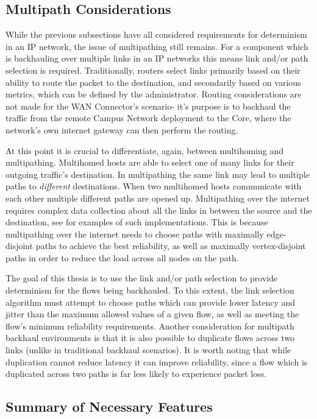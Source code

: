 \subsection{Multipath Considerations}

While the previous subsections have all considered requirements for determinism in an IP network, the issue of multipathing still remains. For a component which is backhauling over multiple links in an IP networks this means link and/or path selection is required. Traditionally, routers select links primarily based on their ability to route the packet to the destination, and secondarily based on various metrics, which can be defined by the administrator. Routing considerations are not made for the WAN Connector's scenario- it's purpose is to backhaul the traffic from the remote Campus Network deployment to the Core, where the network's own internet gateway can then perform the routing.

At this point it is crucial to differentiate, again, between multihoming and multipathing. Multihomed hosts are able to select one of many links for their outgoing traffic's destination. In multipathing the same link may lead to multiple paths to \textit{different} destinations. When two multihomed hosts communicate with each other multiple different paths are opened up. Multipathing over the internet requires complex data collection about all the links in between the source and the destination, see \cite{ganichev2010yamr, apostolaki2021performance,} for examples of such implementations. This is because multipathing over the internet needs to choose paths with maximally edge-disjoint paths to achieve the best reliability, as well as maximally vertex-disjoint paths in order to reduce the load across all nodes on the path.

The goal of this thesis is to use the link and/or path selection to provide determinism for the flows being backhauled. To this extent, the link selection algorithm must attempt to choose paths which can provide lower latency and jitter than the maximum allowed values of a given flow, as well as meeting the flow's minimum reliability requirements. Another consideration for multipath backhaul environments is that it is also possible to duplicate flows across two links (unlike in traditional backhaul scenarios). It is worth noting that while duplication cannot reduce latency it can improve reliability, since a flow which is duplicated across two paths is far less likely to experience packet loss.

\subsection{Summary of Necessary Features}


